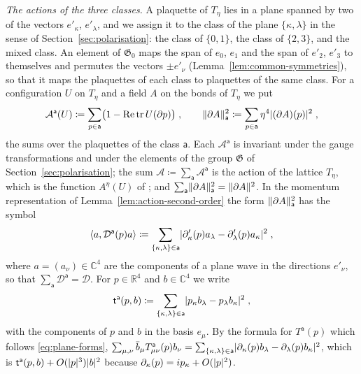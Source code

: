 \documentclass[11pt]{preprint}
\newcommand{\tr}{\operatorname{tr}}
\DeclarePairedDelimiter{\abs}{\lvert}{\rvert}
\DeclarePairedDelimiter{\norm}{\lVert}{\rVert}
\numberwithin{equation}{section}
\theoremstyle{definition}
\theoremstyle{remark}
\theoremstyle{plain}
\begin{document}
\emph{The actions of the three classes.} A plaquette of $T_\eta$ lies in a plane spanned by two of the vectors $e'_\kappa$, $e'_\lambda$, and we assign it to the class of the plane $\{ \kappa, \lambda \}$ in the sense of Section~\ref{sec:polarisation}: the class of $\{ 0, 1 \}$, the class of $\{ 2, 3 \}$, and the mixed class. An element of $\mathfrak G_0$ maps the span of $e_0$, $e_1$ and the span of $e'_2$, $e'_3$ to themselves and permutes the vectors $\pm e'_\nu$ (Lemma~\ref{lem:common-symmetries}), so that it maps the plaquettes of each class to plaquettes of the same class. For a configuration $U$ on $T_\eta$ and a field $A$ on the bonds of $T_\eta$ we put
\begin{equation}\label{eq:class-actions}
    \mathcal A^{\mathsf a}(U) \coloneqq \sum_{p \in \mathsf a}\bigl(1 - \operatorname{Re}\tr U(\partial p)\bigr)\;,
    \qquad
    \norm{\partial A}_{\mathsf a}^2 \coloneqq \sum_{p \in \mathsf a}\eta^4\abs{(\partial A)(p)}^2\;,
\end{equation}
the sums over the plaquettes of the class $\mathsf a$. Each $\mathcal A^{\mathsf a}$ is invariant under the gauge transformations and under the elements of the group $\mathfrak G$ of Section~\ref{sec:polarisation}; the sum $\mathcal A \coloneqq \sum_{\mathsf a}\mathcal A^{\mathsf a}$ is the action of the lattice $T_\eta$, which is the function $A^\eta(U)$ of \cite[(0.21), p.~256]{BalabanRG1}; and $\sum_{\mathsf a}\norm{\partial A}_{\mathsf a}^2 = \norm{\partial A}^2$. In the momentum representation of Lemma~\ref{lem:action-second-order} the form $\norm{\partial A}_{\mathsf a}^2$ has the symbol
\begin{equation}\label{eq:class-symbol}
    \langle a, \mathcal D^{\mathsf a}(p)a\rangle \coloneqq \sum_{\{ \kappa, \lambda \} \in \mathsf a}\abs{\partial'_\kappa(p)a_\lambda - \partial'_\lambda(p)a_\kappa}^2\;,
\end{equation}
where $a = (a_\nu) \in \mathbb C^4$ are the components of a plane wave in the directions $e'_\nu$, so that $\sum_{\mathsf a}\mathcal D^{\mathsf a} = \mathcal D$. For $p \in \mathbb R^4$ and $b \in \mathbb C^4$ we write
\begin{equation}\label{eq:class-leading}
    \mathsf t^{\mathsf a}(p, b) \coloneqq \sum_{\{ \kappa, \lambda \} \in \mathsf a}\abs{p_\kappa b_\lambda - p_\lambda b_\kappa}^2\;,
\end{equation}
with the components of $p$ and $b$ in the basis $e_\mu$. By the formula for $T^{\mathsf a}(p)$ which follows \eqref{eq:plane-forms}, $\sum_{\mu,\nu}\bar b_\mu T^{\mathsf a}_{\mu\nu}(p)b_\nu = \sum_{\{ \kappa, \lambda \} \in \mathsf a}\abs{\partial_\kappa(p)b_\lambda - \partial_\lambda(p)b_\kappa}^2$, which is $\mathsf t^{\mathsf a}(p, b) + O(\abs p^3)\abs b^2$ because $\partial_\kappa(p) = ip_\kappa + O(\abs p^2)$.
\end{document}
